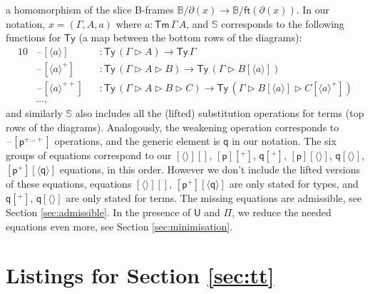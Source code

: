 \documentclass[submission,copyright,creativecommons]{eptcs}
\newcommand{\ra}{\rightarrow}
\newcommand{\Ty}{\mathsf{Ty}}
\newcommand{\Tm}{\mathsf{Tm}}
\newcommand{\p}{\mathsf{p}}
\newcommand{\q}{\mathsf{q}}
\newcommand{\ext}{\mathop{\triangleright}}
\newcommand{\U}{\mathsf{U}}
\newcommand{\blank}{\mathord{\hspace{1pt}\text{--}\hspace{1pt}}} %
\begin{document}
a homomorphism of the slice B-frames $\mathbb{B}/\partial(x) \ra
\mathbb{B}/\mathsf{ft}(\partial(x))$. In our notation, $x = (\Gamma,
A, a)$ where $a : \Tm\,\Gamma\,A$, and $\mathbb{S}$ corresponds to the
following functions for $\Ty$ (a map between the bottom rows of the
diagrams):
\begin{alignat*}{10}
  & \blank[\langle a\rangle] && : \Ty\,(\Gamma\ext A)\ra\Ty\,\Gamma \\
  & \blank[\langle a\rangle^+] && : \Ty\,(\Gamma\ext A\ext B)\ra\Ty\,(\Gamma\ext B[\langle a\rangle]) \\
  & \blank[\langle a\rangle^{++}] && : \Ty\,(\Gamma\ext A\ext B\ext C)\ra\Ty\,(\Gamma\ext B[\langle a\rangle]\ext C[\langle a\rangle^+]) \\
  & \dots,
\end{alignat*}
and similarly $\mathbb{S}$ also includes all the (lifted) substitution
operations for terms (top rows of the
diagrams). Analogously, the weakening operation corresponds to
$\blank[\p^{+\dots+}]$ operations, and the generic element is $\q$ in
our notation. The six groups of equations correspond to our
$[\langle\rangle][]$, $[\p][^+]$, $\q[^+]$, $[\p][\langle\rangle]$,
$\q[\langle\rangle]$, $[\p^+][\langle\q\rangle]$ equations, in this
order. However we don't include the lifted versions of these equations,
equations $[\langle\rangle][]$, $[\p^+][\langle\q\rangle]$ are only
stated for types, and $\q[^+]$, $\q[\langle\rangle]$ are only stated
for terms. The missing equations are admissible, see Section
\ref{sec:admissible}. In the presence of $\U$ and $\Pi$, we
reduce the needed equations even more, see Section
\ref{sec:minimisation}.

\newpage

\section{Listings for Section \ref{sec:tt}}
\label{app:tt}
\end{document}
